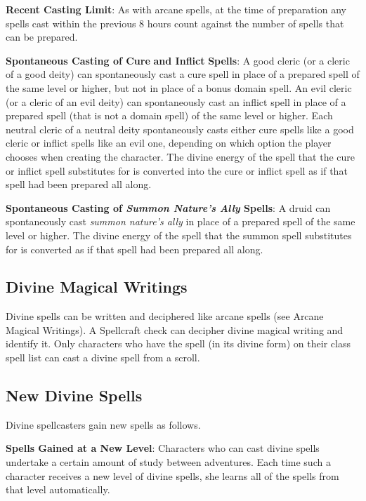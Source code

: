 \textbf{Recent Casting Limit}: As with arcane spells, at the time of preparation any spells cast within the previous 8 hours count against the number of spells that can be prepared.
				
\textbf{Spontaneous Casting of Cure} \textbf{and Inflict} \textbf{Spells}: A good cleric (or a cleric of a good deity) can spontaneously cast a cure spell in place of a prepared spell of the same level or higher, but not in place of a bonus domain spell. An evil cleric (or a cleric of an evil deity) can spontaneously cast an inflict spell in place of a prepared spell (that is not a domain spell) of the same level or higher. Each neutral cleric of a neutral deity spontaneously casts either cure spells like a good cleric or inflict spells like an evil one, depending on which option the player chooses when creating the character. The divine energy of the spell that the cure or inflict spell substitutes for is converted into the cure or inflict spell as if that spell had been prepared all along.
				
\textbf{Spontaneous Casting of  \textit{Summon Nature's Ally } Spells}: A druid can spontaneously cast \textit{summon nature's ally }in place of a prepared spell of the same level or higher. The divine energy of the spell that the summon spell substitutes for is converted as if that spell had been prepared all along.
				
\subsection{Divine Magical Writings}

				
Divine spells can be written and deciphered like arcane spells (see Arcane Magical Writings). A Spellcraft check can decipher divine magical writing and identify it. Only characters who have the spell (in its divine form) on their class spell list can cast a divine spell from a scroll.
				
\subsection{New Divine Spells}

				
Divine spellcasters gain new spells as follows.
				
\textbf{Spells Gained at a New Level}: Characters who can cast divine spells undertake a certain amount of study between adventures. Each time such a character receives a new level of divine spells, she learns all of the spells from that level automatically.
				
